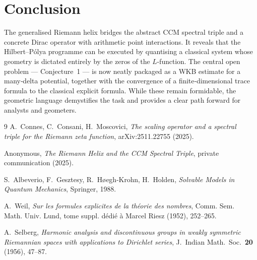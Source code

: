 \documentclass[12pt,a4paper]{article}
\begin{document}
\section{Conclusion}
The generalised Riemann helix bridges the abstract CCM spectral triple and a concrete Dirac operator with arithmetic point interactions.  It reveals that the Hilbert–P\'olya programme can be executed by quantising a classical system whose geometry is dictated entirely by the zeros of the $L$-function.  The central open problem --- Conjecture~1 --- is now neatly packaged as a WKB estimate for a many‑delta potential, together with the convergence of a finite‑dimensional trace formula to the classical explicit formula.  While these remain formidable, the geometric language demystifies the task and provides a clear path forward for analysts and geometers.

\begin{thebibliography}{9}
A.~Connes, C.~Consani, H.~Moscovici,
\emph{The scaling operator and a spectral triple for the Riemann zeta function},
arXiv:2511.22755 (2025).

Anonymous, \emph{The Riemann Helix and the CCM Spectral Triple}, private communication (2025).

S.~Albeverio, F.~Gesztesy, R.~H{\o}egh-Krohn, H.~Holden,
\emph{Solvable Models in Quantum Mechanics}, Springer, 1988.

A.~Weil,
\emph{Sur les formules explicites de la th\'eorie des nombres},
Comm. Sem. Math. Univ. Lund, tome suppl. d\'edi\'e \`a Marcel Riesz (1952), 252--265.

A.~Selberg,
\emph{Harmonic analysis and discontinuous groups in weakly symmetric Riemannian spaces with applications to Dirichlet series},
J.~Indian Math.~Soc.~\textbf{20} (1956), 47--87.
\end{thebibliography}
\end{document}
